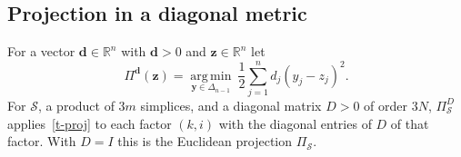 \documentclass[11pt]{article}
\theoremstyle{plain}
\theoremstyle{remark}
\numberwithin{equation}{section}
\begin{document}
\subsection{Projection in a diagonal metric}

For a vector $\bm d\in\mathbb{R}^n$ with $\bm d>0$ and $\bm z\in\mathbb{R}^n$ let
\begin{equation}\label{t-proj}
\Pi^{\bm d}(\bm z)=\operatorname*{arg\,min}_{\bm y\in\Delta_{n-1}}\
\frac12\sum_{j=1}^n d_j\left(y_j-z_j\right)^2 .
\end{equation}
For $\mathcal{S}$, a product of $3m$ simplices, and a diagonal matrix $D>0$
of order $3N$, $\Pi^D_{\mathcal{S}}$ applies~\eqref{t-proj} to each factor
$(k,i)$ with the diagonal entries of $D$ of that factor. With $D=I$ this is
the Euclidean projection $\Pi_{\mathcal{S}}$.
\end{document}
